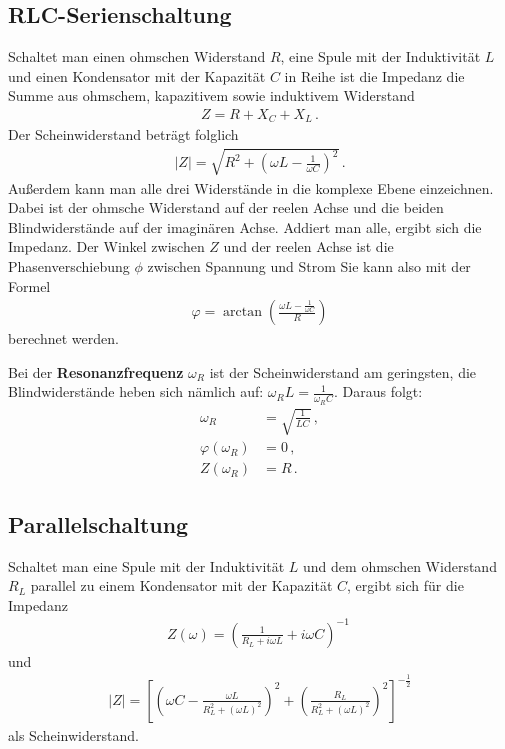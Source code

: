 \documentclass[12pt,a4paper,titlepage,headinclude,bibtotoc]{scrartcl}
\begin{document}
\subsection{RLC-Serienschaltung}
Schaltet man einen ohmschen Widerstand $R$, eine Spule mit der Induktivität $L$ und einen Kondensator mit der Kapazität $C$ in Reihe ist die Impedanz die Summe aus ohmschem, kapazitivem sowie induktivem Widerstand
\begin{align}
	Z=R+X_C+X_L \,.
\end{align}
Der Scheinwiderstand beträgt folglich
\begin{align}
	|Z|=\sqrt{R^2+\left(\omega L - \frac{1}{\omega C}\right)^2} \,.
	\label{eq:Scheinwiderstand_serie}
\end{align}
Außerdem kann man alle drei Widerstände in die komplexe Ebene einzeichnen.
Dabei ist der ohmsche Widerstand auf der reelen Achse und die beiden Blindwiderstände auf der imaginären Achse.
Addiert man alle, ergibt sich die Impedanz.
Der Winkel zwischen $Z$ und der reelen Achse ist die Phasenverschiebung $\phi$ zwischen Spannung und Strom 
Sie kann also mit der Formel 
\begin{align}
	\varphi=\arctan\left(\frac{\omega L - \frac{1}{\omega C}}{R} \right)
	\label{eq:phase_serie}
\end{align}
berechnet werden.

Bei der \textbf{Resonanzfrequenz} $\omega_R$ ist der Scheinwiderstand am geringsten, die Blindwiderstände heben sich nämlich auf: $\omega_R L=\frac{1}{\omega_R C}$.
Daraus folgt:
\begin{align}
	\omega_R&=\sqrt{\frac{1}{LC}}
	\label{eq:omega_R}	
	\,,\\
	\varphi(\omega_R)&=0\,,\\
	Z(\omega_R)&=R\,.
\end{align}

\subsection{Parallelschaltung}
Schaltet man eine Spule mit der Induktivität $L$ und dem ohmschen Widerstand $R_L$ parallel zu einem Kondensator mit der Kapazität $C$, ergibt sich für die Impedanz
\begin{align}
	Z(\omega)=\left(\frac{1}{R_L+i\omega L}+i\omega C\right)^{-1}\
\end{align}
und
\begin{align}
	|Z|=\left[\left(\omega C - \frac{\omega L}{R_L^2+(\omega L)^2}\right)^2+	\left(\frac{R_L}{R_L^2+(\omega L)^2}\right)^2\right]^{-\frac{1}{2}}
	\label{eq:parallel}
\end{align}
als Scheinwiderstand.
                                                                                                                                                                      
\end{document}
